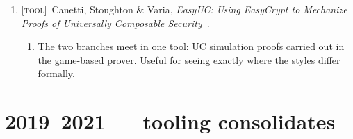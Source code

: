 \documentclass[11pt]{article}
\newcommand{\kind}[1]{{\footnotesize\textsc{\textcolor{yearcolor}{[#1]}}}\ }
\newcommand{\tool}{\kind{tool}}
\newcommand{\paper}[3]{#1, \emph{#2}~\cite{#3}.}
\begin{document}
\begin{enumerate}
  \item \tool \paper{Canetti, Stoughton \& Varia}{EasyUC: Using EasyCrypt to
    Mechanize Proofs of Universally Composable Security}{EasyUC19}
    \begin{enumerate}
      \item The two branches meet in one tool: UC simulation proofs carried out
        in the game-based prover. Useful for seeing exactly where the styles
        differ formally.
    \end{enumerate}
\end{enumerate}

\section{2019--2021 --- tooling consolidates}
\end{document}
